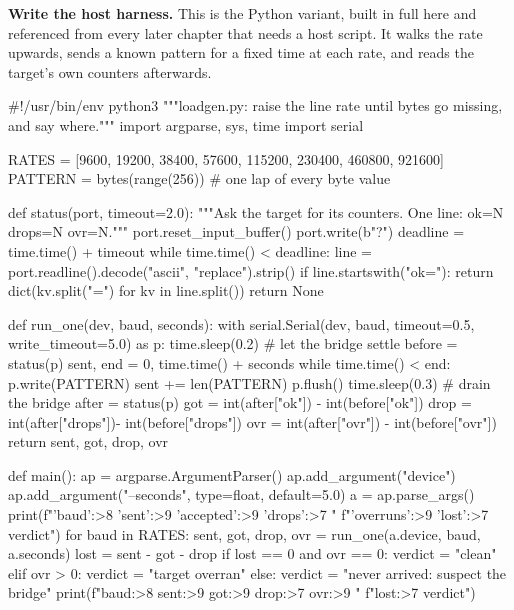 \begin{steps}
\item \textbf{Write the host harness.} This is the Python variant, built in full
here and referenced from every later chapter that needs a host script. It walks
the rate upwards, sends a known pattern for a fixed time at each rate, and reads
the target's own counters afterwards.
\begin{pycode}
#!/usr/bin/env python3
"""loadgen.py: raise the line rate until bytes go missing, and say where."""
import argparse, sys, time
import serial

RATES = [9600, 19200, 38400, 57600, 115200, 230400, 460800, 921600]
PATTERN = bytes(range(256))          # one lap of every byte value

def status(port, timeout=2.0):
    """Ask the target for its counters. One line: ok=N drops=N ovr=N."""
    port.reset_input_buffer()
    port.write(b"?\n")
    deadline = time.time() + timeout
    while time.time() < deadline:
        line = port.readline().decode("ascii", "replace").strip()
        if line.startswith("ok="):
            return dict(kv.split("=") for kv in line.split())
    return None

def run_one(dev, baud, seconds):
    with serial.Serial(dev, baud, timeout=0.5, write_timeout=5.0) as p:
        time.sleep(0.2)                       # let the bridge settle
        before = status(p)
        sent, end = 0, time.time() + seconds
        while time.time() < end:
            p.write(PATTERN)
            sent += len(PATTERN)
        p.flush()
        time.sleep(0.3)                       # drain the bridge
        after = status(p)
    got  = int(after["ok"])   - int(before["ok"])
    drop = int(after["drops"])- int(before["drops"])
    ovr  = int(after["ovr"])  - int(before["ovr"])
    return sent, got, drop, ovr

def main():
    ap = argparse.ArgumentParser()
    ap.add_argument("device")
    ap.add_argument("--seconds", type=float, default=5.0)
    a = ap.parse_args()
    print(f"{'baud':>8} {'sent':>9} {'accepted':>9} {'drops':>7} "
          f"{'overruns':>9} {'lost':>7} verdict")
    for baud in RATES:
        sent, got, drop, ovr = run_one(a.device, baud, a.seconds)
        lost = sent - got - drop
        if lost == 0 and ovr == 0:
            verdict = "clean"
        elif ovr > 0:
            verdict = "target overran"
        else:
            verdict = "never arrived: suspect the bridge"
        print(f"{baud:>8} {sent:>9} {got:>9} {drop:>7} {ovr:>9} "
              f"{lost:>7} {verdict}")


\end{pycode}
\end{steps}

